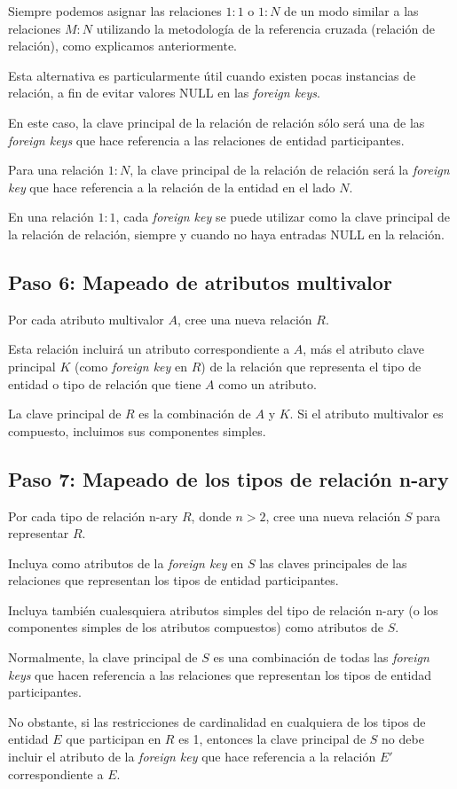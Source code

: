 Siempre podemos asignar las relaciones $1:1$ o $1:N$ de un modo similar a las relaciones $M:N$ utilizando la metodología de la referencia cruzada (relación de relación), como explicamos anteriormente. 


Esta alternativa es particularmente útil cuando existen pocas instancias de relación, a fin de evitar valores NULL en las \textit{foreign keys}.


En este caso, la clave principal de la relación de relación sólo será una de las \textit{foreign keys} que hace referencia a las relaciones de entidad participantes. 


Para una relación $1:N$, la clave principal de la relación de relación será la \textit{foreign key} que hace referencia a la relación de la entidad en el lado $N$.


En una relación $1:1$, cada \textit{foreign key} se puede utilizar como la clave principal de la relación de relación, siempre y cuando no haya entradas NULL en la relación.




\subsection*{Paso 6: Mapeado de atributos multivalor}

Por cada atributo multivalor $A$, cree una nueva relación $R$.


Esta relación incluirá un atributo correspondiente a $A$, más el atributo clave principal $K$ (como \textit{foreign key} en $R$) de la relación que representa el tipo de entidad o tipo de relación que tiene $A$ como un atributo.


La clave principal de $R$ es la combinación de $A$ y $K$. Si el atributo multivalor es compuesto, incluimos sus componentes simples.


\subsection*{Paso 7: Mapeado de los tipos de relación n-ary}
Por cada tipo de relación n-ary $R$, donde $n > 2$, cree una nueva relación $S$ para representar $R$.


Incluya como atributos de la \textit{foreign key} en $S$ las claves principales de las relaciones que representan los tipos de entidad participantes. 


Incluya también cualesquiera atributos simples del tipo de relación n-ary (o los componentes simples de los atributos compuestos) como atributos de $S$.


Normalmente, la clave principal de $S$ es una combinación de todas las \textit{foreign keys} que hacen referencia a las relaciones que representan los tipos de entidad participantes.


No obstante, si las restricciones de cardinalidad en cualquiera de los tipos de entidad $E$ que participan en $R$ es 1, entonces la clave principal de $S$ no debe incluir el atributo de la \textit{foreign key} que hace referencia a la relación $E'$ correspondiente a $E$.

